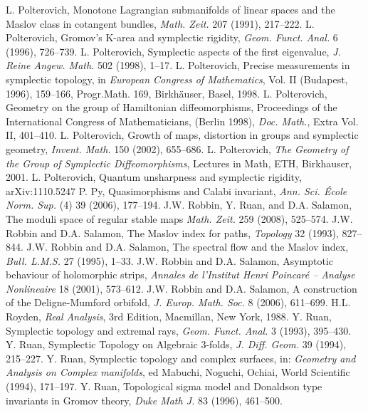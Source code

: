  L. Polterovich, Monotone Lagrangian submanifolds of linear spaces and the Maslov class in cotangent bundles, \emph{Math. Zeit.} 207 (1991), 217--222.
 L. Polterovich, Gromov’s K-area and symplectic rigidity, \emph{Geom. Funct. Anal.} 6 (1996), 726--739.
 L. Polterovich, Symplectic aspects of the first eigenvalue, \emph{J. Reine Angew. Math.} 502 (1998), 1--17.
 L. Polterovich, Precise measurements in symplectic topology, in \emph{European Congress of Mathematics}, Vol. II (Budapest, 1996), 159--166, Progr.Math. 169, Birkhäuser, Basel, 1998.
 L. Polterovich, Geometry on the group of Hamiltonian diffeomorphisms, Proceedings of the International Congress of Mathematicians, (Berlin 1998), \emph{Doc. Math.}, Extra Vol. II, 401--410.
 L. Polterovich, Growth of maps, distortion in groups and symplectic geometry, \emph{Invent. Math.} 150 (2002), 655--686.
 L. Polterovich, \emph{The Geometry of the Group of Symplectic Diffeomorphisms}, Lectures in Math, ETH, Birkhauser, 2001.
 L. Polterovich, Quantum unsharpness and symplectic rigidity, arXiv:1110.5247
 P. Py, Quasimorphisms and Calabi invariant, \emph{Ann. Sci. École Norm. Sup.} (4) 39 (2006), 177--194.
 J.W. Robbin, Y. Ruan, and D.A. Salamon, The moduli space of regular stable maps \emph{Math. Zeit.} 259 (2008), 525--574.
 J.W. Robbin and D.A. Salamon, The Maslov index for paths, \emph{Topology} 32 (1993), 827--844.
 J.W. Robbin and D.A. Salamon, The spectral flow and the Maslov index, \emph{Bull. L.M.S.} 27 (1995), 1--33.
 J.W. Robbin and D.A. Salamon, Asymptotic behaviour of holomorphic strips, \emph{Annales de l’Institut Henri Poincaré -- Analyse Nonlineaire} 18 (2001), 573--612.
 J.W. Robbin and D.A. Salamon, A construction of the Deligne-Mumford orbifold, \emph{J. Europ. Math. Soc.} 8 (2006), 611--699.
 H.L. Royden, \emph{Real Analysis}, 3rd Edition, Macmillan, New York, 1988.
 Y. Ruan, Symplectic topology and extremal rays, \emph{Geom. Funct. Anal.} 3 (1993), 395--430.
 Y. Ruan, Symplectic Topology on Algebraic 3-folds, \emph{J. Diff. Geom.} 39 (1994), 215--227.
 Y. Ruan, Symplectic topology and complex surfaces, in: \emph{Geometry and Analysis on Complex manifolds}, ed Mabuchi, Noguchi, Ochiai, World Scientific (1994), 171--197.
 Y. Ruan, Topological sigma model and Donaldson type invariants in Gromov theory, \emph{Duke Math J.} 83 (1996), 461--500.
